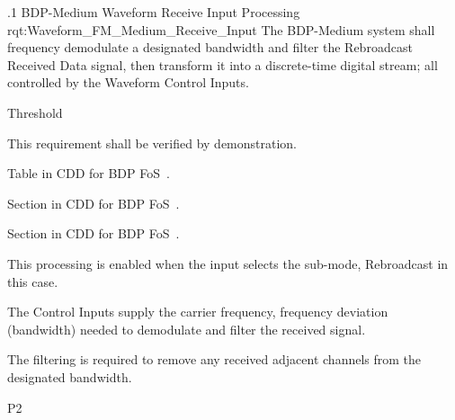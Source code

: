 \ONERQMTVKPP
{\RqtNumberBase.1}
{BDP-Medium \FM Waveform Receive Input Processing}
{rqt:Waveform_FM_Medium_Receive_Input}
{The BDP-Medium system shall frequency demodulate a designated bandwidth and filter the \FM Rebroadcast Received \RF Data signal, then transform it into a discrete-time digital stream; all controlled by the Waveform Control Inputs.}
{
	\item [Phase 1]  Threshold
}
{This requirement shall be verified by demonstration.}
{
	\item [5.4] Table in CDD for BDP FoS~\cite{ref__BDP_FOS_CDD}.
	\item [5.5.5] Section in CDD for BDP FoS~\cite{ref__BDP_FOS_CDD}.
	\item [5.5.12] Section in CDD for BDP FoS~\cite{ref__BDP_FOS_CDD}.
}
{
	\item This processing is enabled when the input selects the sub-mode, \FM Rebroadcast in this case.
	\item The Control Inputs supply the \RF carrier frequency, frequency deviation (bandwidth) needed to demodulate and filter the received \FM signal.
	\item The filtering is required to remove any received adjacent channels from the designated bandwidth.
}
{P2}



